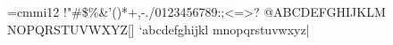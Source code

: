 \font\rmt=cmmi12
\rmt
 !"\#\$\%\&'()*+,-./0123456789:;<=>?
@ABCDEFGHIJKLM
NOPQRSTUVWXYZ[]
`abcdefghijkl
mnopqrstuvwxyz{|}
